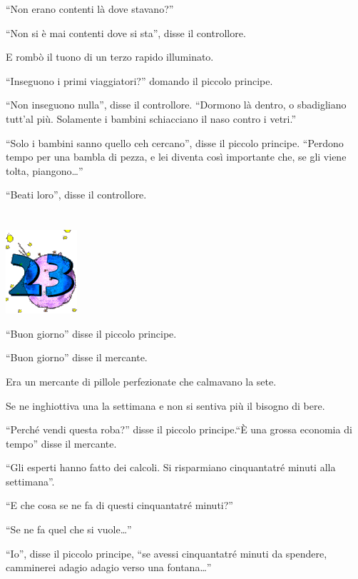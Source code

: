 \documentclass[11pt]{scrbook}
\begin{document}
``Non erano contenti là dove stavano?''

``Non si è mai contenti dove si sta'', disse il controllore.

E rombò il tuono di un terzo rapido illuminato.

``Inseguono i primi viaggiatori?'' domando il piccolo principe.

``Non inseguono nulla'', disse il controllore. ``Dormono là dentro, o
sbadigliano tutt'al più. Solamente i bambini schiacciano il naso contro
i vetri.''

``Solo i bambini sanno quello ceh cercano'', disse il piccolo principe.
``Perdono tempo per una bambla di pezza, e lei diventa così importante
che, se gli viene tolta, piangono\ldots{}''

``Beati loro'', disse il controllore.

\chapter{}
\begin{center}
\includegraphics{img/chapter23}
\end{center}

``Buon giorno'' disse il piccolo principe.

``Buon giorno'' disse il mercante.

Era un mercante di pillole perfezionate che calmavano la sete.

Se ne inghiottiva una la settimana e non si sentiva più il bisogno di
bere.

``Perché vendi questa roba?'' disse il piccolo principe.``È una grossa
economia di tempo'' disse il mercante.

``Gli esperti hanno fatto dei calcoli. Si risparmiano cinquantatré
minuti alla settimana''.

``E che cosa se ne fa di questi cinquantatré minuti?''

``Se ne fa quel che si vuole\ldots{}''

``Io'', disse il piccolo principe, ``se avessi cinquantatré minuti da
spendere, camminerei adagio adagio verso una fontana\ldots{}''
\end{document}
